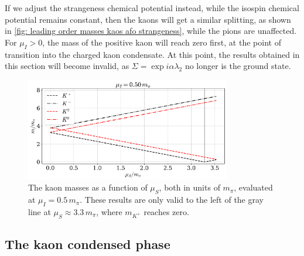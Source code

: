 If we adjust the strangeness chemical potential instead, while the isospin chemical potential remains constant, then the kaons will get a similar splitting, as shown in \autoref{fig: leading order masses kaos afo strangeness}, while the pions are unaffected.
For $\mu_I > 0$, the mass of the positive kaon will reach zero first, at the point of transition into the charged kaon condensate.
At this point, the results obtained in this section will become invalid, as $\Sigma = \exp{i \alpha \lambda_2}$ no longer is the ground state.


\begin{figure}
    \centering
    \includegraphics[width=0.8\textwidth]{../scripts/figurer/masses_kaons2.pdf}
    \caption{
        The kaon masses as a function of $\mu_S$, both in units of $m_\pi$, evaluated at $\mu_I = 0.5 \, m_\pi$.
        These results are only valid to the left of the gray line at $\mu_S\approx 3.3 \, m_\pi$, where $m_{K^+}$ reaches zero.
    }
    \label{fig: leading order masses kaos afo strangeness}
\end{figure}





\subsection{The kaon condensed phase}

